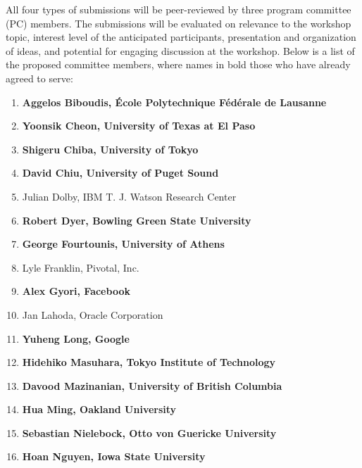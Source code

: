 \documentclass[10pt, conference]{IEEEtran}
\begin{document}
All four types of submissions will be peer-reviewed by three program committee (PC) members. The submissions will be evaluated on relevance to the workshop topic, interest level of the anticipated participants, presentation and organization of ideas, and potential for engaging discussion at the workshop. Below is a list of the proposed committee members, where names in bold those who have already agreed to serve:

\begin{enumerate}

	\item \textbf{Aggelos Biboudis, École Polytechnique Fédérale de Lausanne}

	\item \textbf{Yoonsik Cheon, University of Texas at El Paso}

	\item \textbf{Shigeru Chiba, University of Tokyo}

	\item \textbf{David Chiu, University of Puget Sound}

	\item Julian Dolby, IBM T. J. Watson Research Center

	\item \textbf{Robert Dyer, Bowling Green State University}

	\item \textbf{George Fourtounis, University of Athens}

	\item Lyle Franklin, Pivotal, Inc.

	\item \textbf{Alex Gyori, Facebook}

	\item Jan Lahoda, Oracle Corporation

	\item \textbf{Yuheng Long, Google}

	\item \textbf{Hidehiko Masuhara, Tokyo Institute of Technology}

	\item \textbf{Davood Mazinanian, University of British Columbia}

	\item \textbf{Hua Ming, Oakland University}

	\item \textbf{Sebastian Nielebock, Otto von Guericke University}

	\item \textbf{Hoan Nguyen, Iowa State University}


\end{enumerate}
\end{document}
